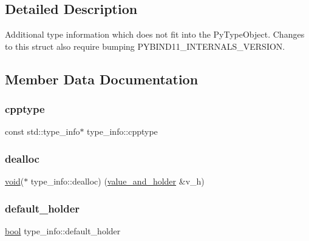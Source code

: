 \subsection{Detailed Description}
Additional type information which does not fit into the Py\+Type\+Object. Changes to this struct also require bumping {\ttfamily P\+Y\+B\+I\+N\+D11\+\_\+\+I\+N\+T\+E\+R\+N\+A\+L\+S\+\_\+\+V\+E\+R\+S\+I\+ON}. 

\subsection{Member Data Documentation}
\mbox{\label{structtype__info_ae4ae74c1d137f901f75c28e847e157e1}} 
\subsubsection{\texorpdfstring{cpptype}{cpptype}}
{\footnotesize\ttfamily const std\+::type\+\_\+info$\ast$ type\+\_\+info\+::cpptype}

\mbox{\label{structtype__info_a79c1cb88eb2e8fdc60d7370eaf2ad0ea}} 
\subsubsection{\texorpdfstring{dealloc}{dealloc}}
{\footnotesize\ttfamily \mbox{\hyperlink{_s_d_l__opengles2__gl2ext_8h_ae5d8fa23ad07c48bb609509eae494c95}{void}}($\ast$ type\+\_\+info\+::dealloc) (\mbox{\hyperlink{structvalue__and__holder}{value\+\_\+and\+\_\+holder}} \&v\+\_\+h)}

\mbox{\label{structtype__info_ac917cda35113f21ca3951c4d11f2aa71}} 
\subsubsection{\texorpdfstring{default\_holder}{default\_holder}}
{\footnotesize\ttfamily \mbox{\hyperlink{asdl_8h_af6a258d8f3ee5206d682d799316314b1}{bool}} type\+\_\+info\+::default\+\_\+holder}

\mbox{\label{structtype__info_ad1ea3e4746ea66e67520e829541efd95}} 
